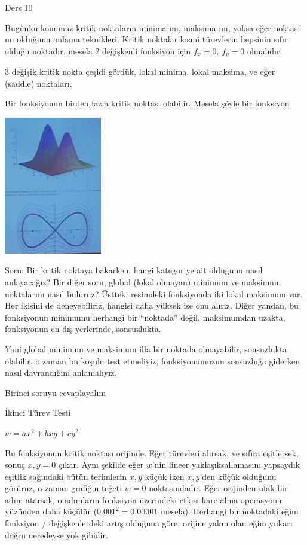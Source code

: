 \documentclass[12pt,fleqn]{article}\usepackage{../../common}
\begin{document}
Ders 10

Bugünkü konumuz kritik noktaların minima mı, maksima mı, yoksa eğer noktası
mı olduğunu anlama teknikleri. Kritik noktalar kısmi türevlerin hepsinin
sıfır olduğu noktadır, mesela 2 değişkenli fonksiyon için $f_x=0$, $f_y=0$
olmalıdır. 

3 değişik kritik nokta çeşidi gördük, lokal minima, lokal maksima, ve
eğer (saddle) noktaları. 

Bir fonksiyonun birden fazla kritik noktası olabilir. Mesela şöyle bir
fonksiyon

\begin{center}
\includegraphics[height=6cm]{10_1.png}
\end{center}

Soru: Bir kritik noktaya bakarken, hangi kategoriye ait olduğunu nasıl
anlayacağız? Bir diğer soru, global (lokal olmayan) minimum ve maksimum
noktalarını nasıl buluruz?  Üstteki resimdeki fonksiyonda iki lokal maksimum
var. Her ikisini de deneyebiliriz, hangisi daha yüksek ise onu alırız. Diğer
yandan, bu fonksiyonun minimumu herhangi bir ``noktada'' değil, maksimumdan
uzakta, fonksiyonun en dış yerlerinde, sonsuzlukta.

Yani global minimum ve maksimum illa bir noktada olmayabilir, sonsuzlukta
olabilir, o zaman bu koşulu test etmeliyiz, fonksiyonumuzun sonsuzluğa
giderken nasıl davrandığını anlamalıyız.

Birinci soruyu cevaplayalım

İkinci Türev Testi

$w = ax^2 + bxy + cy^2$

Bu fonksiyonun kritik noktası orijinde. Eğer türevleri alırsak, ve sıfıra
eşitlersek, sonuç $x,y=0$ çıkar. Aynı şekilde eğer $w$'nin lineer
yaklaşıksallamasını yapsaydık eşitlik sağındaki bütün terimlerin $x,y$ küçük
iken $x,y$'den küçük olduğunu görürüz, o zaman grafiğin teğeti $w=0$
noktasındadır. Eğer orijinden ufak bir adım atarsak, o adımların fonksiyon
üzerindeki etkisi kare alma operasyonu yüzünden daha küçülür ($0.001^2 =
0.00001$ mesela). Herhangi bir noktadaki eğim fonksiyon / değişkenlerdeki artış
olduğuna göre, orijine yakın olan eğim yukarı doğru neredeyse yok gibidir.
\end{document}
